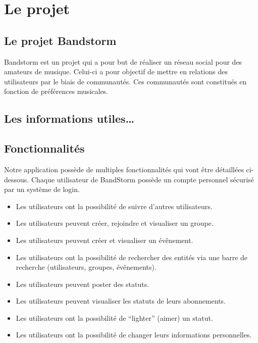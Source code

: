 \documentclass[12pt,a4paper,oneside]{book}
\begin{document}
	\thispagestyle{empty} %
	\titleBC

	\setcounter{tocdepth}{1}
	\setcounter{secnumdepth}{3}
	\setcounter{minitocdepth}{1}
	
	\tableofcontents
	\chapter{Le projet}
	\section{Le projet Bandstorm}
	Bandstorm est un projet qui a pour but de réaliser un réseau social pour des amateurs de musique. Celui-ci a pour objectif de mettre en relations des utilisateurs par le biais de communautés. Ces communautés sont constitués en fonction de préférences musicales.
	\section{Les informations utiles\ldots}
	\section{Fonctionnalités}
	Notre application possède de multiples fonctionnalités qui vont être détaillées ci-dessous.
	Chaque utilisateur de BandStorm possède un compte personnel sécurisé par un système de login.
	
	\begin{itemize}
		\item Les utilisateurs ont la possibilité de suivre d’autres utilisateurs.
		\item Les utilisateurs peuvent créer, rejoindre et visualiser un groupe.
		\item Les utilisateurs peuvent créer et visualiser un évênement.
		\item Les utilisateurs ont la possibilité de rechercher des entités via une barre de recherche (utilisateurs, groupes, évênements).
		\item Les utilisateurs peuvent poster des statuts.
		\item Les utilisateurs peuvent visualiser les statuts de leurs abonnements.
		\item Les utilisateurs ont la possibilité de “lighter” (aimer) un statut.
		\item Les utilisateurs ont la possibilité de changer leurs informations personnelles.
	\end{itemize}	
	
\end{document}

